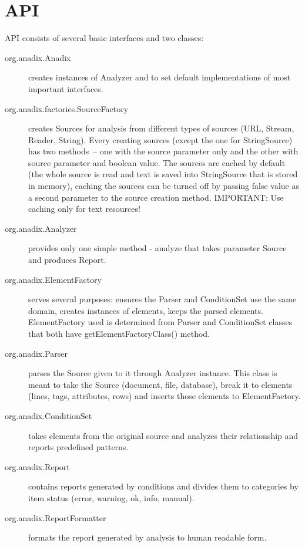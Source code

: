\documentclass{report}
\begin{document}
\section{API}
API consists of several basic interfaces and two classes:
\begin{description}
\item[org.anadix.Anadix] creates instances of Analyzer and to set default
implementations of most important interfaces.
\item[org.anadix.factories.SourceFactory] creates Sources for analysis from
different types of sources (URL, Stream, Reader, String). Every creating sources (except the one for StringSource) has two methods~-- one with the source parameter only and the other with source parameter and boolean value. The sources are cached by default (the whole source is read and text is saved into StringSource that is stored in memory), caching the sources can be turned off by passing false value as a second parameter to the source creation method. IMPORTANT: Use caching only for text resources!
\item[org.anadix.Analyzer] provides only one simple method - analyze that takes
parameter Source and produces Report.
\item[org.anadix.ElementFactory] serves several purposes: ensures the Parser and
ConditionSet use the same domain, creates instances of elements, keeps the
parsed elements. ElementFactory used is determined from Parser and ConditionSet
classes that both have getElementFactoryClass() method.
\item[org.anadix.Parser] parses the Source given to it through Analyzer
instance. This class is meant to take the Source (document, file, database),
break it to elements (lines, tags, attributes, rows) and inserts those elements
to ElementFactory.
\item[org.anadix.ConditionSet] takes elements from the original source and
analyzes their relationship and reports predefined patterns.
\item[org.anadix.Report] contains reports generated by conditions and divides
them to categories by item status (error, warning, ok, info, manual).
\item[org.anadix.ReportFormatter] formats the report generated by analysis to
human readable form.
\end{description}
\end{document}
